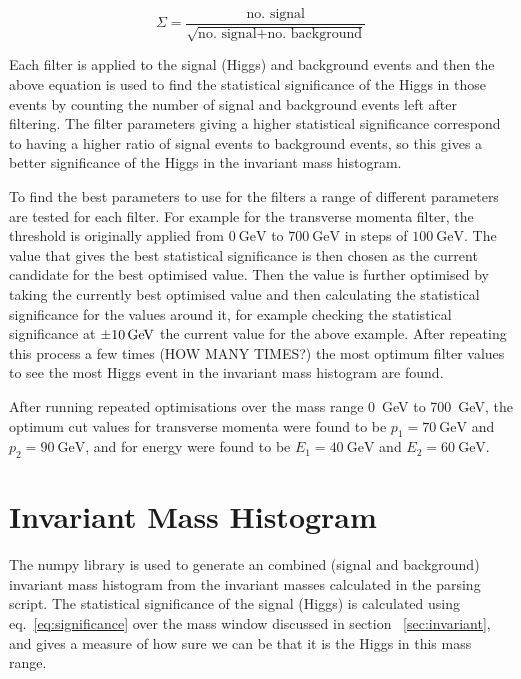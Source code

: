 \documentclass[11pt]{amsart}
\begin{document}
\begin{multicols}{2}
\begin{equation}
  \label{eq:significance}
  \Sigma = \frac{\text{no. signal}}{\sqrt{\text{no. signal} + \text{no. background}}}
\end{equation}

Each filter is applied to the signal (Higgs) and background events and then the above equation is used to find the statistical significance of the Higgs in those events by counting the number of signal and background events left after filtering. The filter parameters giving a higher statistical significance correspond to having a higher ratio of signal events to background events, so this gives a better significance of the Higgs in the invariant mass histogram.

To find the best parameters to use for the filters a range of different parameters are tested for each filter. For example for the transverse momenta filter, the threshold is originally applied from $\SI{0}{\giga\electronvolt}$ to $\SI{700}{\giga\electronvolt}$ in steps of $\SI{100}{\giga\electronvolt}$. The value that gives the best statistical significance is then chosen as the current candidate for the best optimised value. Then the value is further optimised by taking the currently best optimised value and then calculating the statistical significance for the values around it, for example checking the statistical significance at $\SI{\pm10}{\giga\electronvolt}$ the current value for the above example. After repeating this process a few times (HOW MANY TIMES?) the most optimum filter values to see the most Higgs event in the invariant mass histogram are found.


After running repeated optimisations over the mass range \SI{0}{\giga\electronvolt} to \SI{700}{\giga\electronvolt}, the optimum cut values for transverse momenta were found to be $p_1 = \SI{70}{\giga\electronvolt}$ and $p_2 = \SI{90}{\giga\electronvolt}$, and for energy were found to be $E_1 = \SI{40}{\giga\electronvolt}$ and $E_2 = \SI{60}{\giga\electronvolt}$.

\section{Invariant Mass Histogram}

The numpy library is used to generate an combined (signal and background) invariant mass histogram from the invariant masses calculated in the parsing script. The statistical significance of the signal (Higgs) is calculated using eq.~\ref{eq:significance} over the mass window discussed in section ~\ref{sec:invariant}, and gives a measure of how sure we can be that it is the Higgs in this mass range.


\end{multicols}
\end{document}
